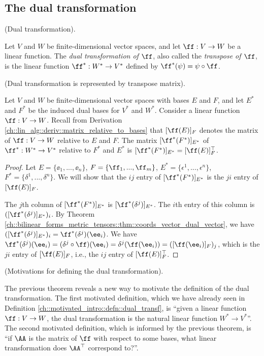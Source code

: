 \subsection*{The dual transformation}

\begin{defn}
\label{ch::motivated_intro::defn::dual_transf}
    (Dual transformation).
    
    Let $V$ and $W$ be finite-dimensional vector spaces, and let $\ff:V \rightarrow W$ be a linear function.
    The \textit{dual transformation of $\ff$}, also called the \textit{transpose of $\ff$}, is the linear function $\ff^*:W^* \rightarrow V^*$ defined by $\ff^*(\psi) = \psi \circ \ff$.
\end{defn}

\begin{theorem}
    (Dual transformation is represented by transpose matrix).

    Let $V$ and $W$ be finite-dimensional vector spaces with bases $E$ and $F$, and let $E^*$ and $F^*$ be the induced dual bases for $V^*$ and $W^*$. Consider a linear function $\ff:V \rightarrow W$. Recall from Derivation \ref{ch::lin_alg::deriv::matrix_relative_to_bases} that $[\ff(E)]_F$ denotes the matrix of $\ff:V \rightarrow W$ relative to $E$ and $F$. The matrix $[\ff^*(F^*)]_{E^*}$ of $\ff^*:W^* \rightarrow V^*$ relative to $F^*$ and $E^*$ is $[\ff^*(F^*)]_{E^*} = [\ff(E)]_F^{\top}$.
\end{theorem}

\begin{proof}
    Let $E = \{\ee_1, ..., \ee_n\}$, $F = \{\ff_1, ..., \ff_m\}$, $E^* = \{\epsilon^1, ..., \epsilon^n\}$, $F^* = \{\delta^1, ..., \delta^n\}$. We will show that the $ij$ entry of $[\ff^*(F^*)]_{E^*}$ is the $ji$ entry of $[\ff(E)]_F$.
    
    The $j$th column of $[\ff^*(F^*)]_{E^*}$ is $[\ff^*(\delta^j)]_{E^*}$. The $i$th entry of this column is $([\ff^*(\delta^j)]_{E^*})_i$. By Theorem \ref{ch::bilinear_forms_metric_tensors::thm::coords_vector_dual_vector}, we have $([\ff^*(\delta^j)]_{E^*})_i = \ff^*(\delta^j)(\ee_i)$. We have $\ff^*(\delta^j)(\ee_i) = (\delta^j \circ \ff)(\ee_i) = \delta^j(\ff(\ee_i)) = ([\ff(\ee_i)]_F)_j$, which is the $ji$ entry of $[\ff(E)]_F$, i.e., the $ij$ entry of $[\ff(E)]_F^\top$.
\end{proof}

\begin{remark}
    (Motivations for defining the dual transformation).
    
    The previous theorem reveals a new way to motivate the definition of the dual transformation. The first motivated definition, which we have already seen in Definition \ref{ch::motivated_intro::defn::dual_transf}, is ``given a linear function $\ff:V \rightarrow W$, the dual transformation is the natural linear function $W^* \rightarrow V^*$''. The second motivated definition, which is informed by the previous theorem, is ``if $\AA$ is the matrix of $\ff$ with respect to some bases, what linear transformation does $\AA^\top$ correspond to?''.
\end{remark}

